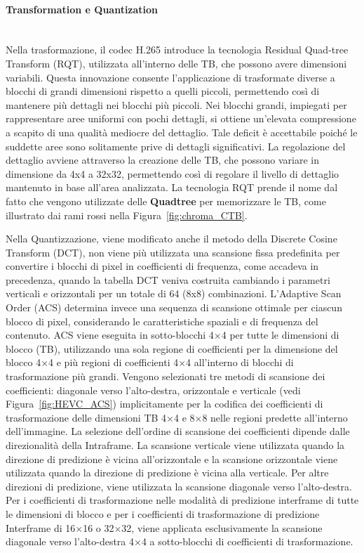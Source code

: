 \documentclass[a4paper,12pt, oneside]{article}
\begin{document}
\paragraph{Transformation e Quantization}\hphantom{A}\\
Nella trasformazione, il codec H.265 introduce la tecnologia Residual Quad-tree Transform (RQT), utilizzata
all'interno delle TB, che possono avere dimensioni variabili. Questa innovazione consente l'applicazione di
trasformate diverse a blocchi di grandi dimensioni rispetto a quelli piccoli, permettendo così di mantenere
più dettagli nei blocchi più piccoli. Nei blocchi grandi, impiegati per rappresentare aree uniformi con
pochi dettagli, si ottiene un'elevata compressione a scapito di una qualità mediocre del dettaglio. Tale
deficit è accettabile poiché le suddette aree sono solitamente prive di dettagli significativi. La
regolazione del dettaglio avviene attraverso la creazione delle TB, che possono variare in dimensione
da 4x4 a 32x32, permettendo così di regolare il livello di dettaglio mantenuto in base all'area analizzata.
La tecnologia RQT prende il nome dal fatto che vengono utilizzate delle \textbf{Quadtree} per memorizzare
le TB, come illustrato dai rami rossi nella Figura~\ref{fig:chroma_CTB}.

Nella Quantizzazione, viene modificato anche il metodo della Discrete Cosine Transform (DCT), non viene
più utilizzata una scansione fissa predefinita per convertire i blocchi di pixel in coefficienti di frequenza, come accadeva in precedenza,
quando la tabella DCT veniva costruita cambiando i parametri verticali e orizzontali per un totale di 64 (8x8)
combinazioni.
L'Adaptive Scan Order (ACS) determina invece una sequenza di scansione ottimale per ciascun blocco di pixel,
considerando le caratteristiche spaziali e di frequenza del contenuto. ACS viene eseguita in sotto-blocchi
4×4 per tutte le dimensioni di blocco (TB), utilizzando una sola regione di coefficienti per la dimensione
del blocco 4×4 e più regioni di coefficienti 4×4 all'interno di blocchi di trasformazione più grandi. Vengono
selezionati tre metodi di scansione dei coefficienti: diagonale verso l'alto-destra, orizzontale e verticale
(vedi Figura~\ref{fig:HEVC_ACS}) implicitamente per la codifica dei coefficienti di trasformazione delle
dimensioni TB 4×4 e 8×8 nelle regioni predette all'interno dell'immagine. La selezione dell'ordine di
scansione dei coefficienti dipende dalle direzionalità della Intraframe. La scansione verticale viene
utilizzata quando la direzione di predizione è vicina all'orizzontale e la scansione orizzontale viene
utilizzata quando la direzione di predizione è vicina alla verticale. Per altre direzioni di predizione,
viene utilizzata la scansione diagonale verso l'alto-destra. Per i coefficienti di trasformazione nelle
modalità di predizione interframe di tutte le dimensioni di blocco e per i coefficienti di trasformazione
di predizione Interframe di 16×16 o 32×32, viene applicata esclusivamente la scansione diagonale verso
l'alto-destra 4×4 a sotto-blocchi di coefficienti di trasformazione.
\end{document}
